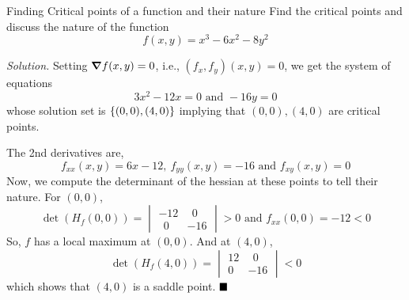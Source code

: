 \documentclass[../Analysis-3.tex]{subfiles}
\begin{document}
\begin{Eg}{Finding Critical points of a function and their nature}{}
  Find the critical points and discuss the nature of the function
  \[ f(x,y) = x^3 - 6x^2 - 8y^2 \]

  \textit{Solution. } Setting $ \grad f(x,y) = 0 $, i.e., $ (f_x,f_y)(x,y) = 0 $, we get the system of equations
  \[ 3x^2 - 12x = 0 \text{  and  }  -16y = 0\]
  whose solution set is $ \qty{(0,0),(4,0)} $ implying that $(0,0), (4,0)$ are critical points.

  The 2nd derivatives are, \[ f_{xx}(x,y) = 6x - 12,\ f_{yy}(x,y) = -16 \text{ and } f_{xy}(x,y) = 0 \]
  Now, we compute the determinant of the hessian at these points to tell their nature. For $(0,0)$,
  \[ \det(H_f(0,0)) =  \begin{vmatrix}
      -12   & \ \ 0 \\
      \ \ 0 & -16
    \end{vmatrix} > 0 \text{  and  } f_{xx}(0,0) = -12 < 0\]
  So, $f$ has a local maximum at $(0,0)$. And at $(4,0)$,
  \[ \det(H_f(4,0)) =  \begin{vmatrix}
      12 & \ \ 0 \\
      0  & -16
    \end{vmatrix} < 0 \]
  which shows that $(4,0)$ is a saddle point. $\hfill \blacksquare$
\end{Eg}
\end{document}
